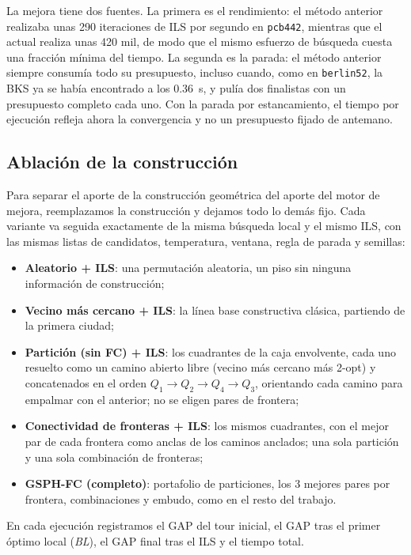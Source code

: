 \documentclass[runningheads]{llncs}
\begin{document}
La mejora tiene dos fuentes. La primera es el rendimiento: el método
anterior realizaba unas 290 iteraciones de ILS por segundo en
\texttt{pcb442}, mientras que el actual realiza unas 420 mil, de modo
que el mismo esfuerzo de búsqueda cuesta una fracción mínima del tiempo.
La segunda es la parada: el método anterior siempre consumía todo su
presupuesto, incluso cuando, como en \texttt{berlin52}, la BKS ya se
había encontrado a los 0.36~s, y pulía dos finalistas con un presupuesto
completo cada uno. Con la parada por estancamiento, el tiempo por
ejecución refleja ahora la convergencia y no un presupuesto fijado de
antemano.

\subsection{Ablación de la construcción}
\label{sec:ablation}

Para separar el aporte de la construcción geométrica del aporte del
motor de mejora, reemplazamos la construcción y dejamos todo lo demás
fijo. Cada variante va seguida exactamente de la misma búsqueda local y
el mismo ILS, con las mismas listas de candidatos, temperatura, ventana,
regla de parada y semillas:
\begin{itemize}
  \item \textbf{Aleatorio + ILS}: una permutación aleatoria, un piso sin
    ninguna información de construcción;
  \item \textbf{Vecino más cercano + ILS}: la línea base constructiva
    clásica, partiendo de la primera ciudad;
  \item \textbf{Partición (sin FC) + ILS}: los cuadrantes de la caja
    envolvente, cada uno resuelto como un camino abierto libre (vecino
    más cercano más 2-opt) y concatenados en el orden
    $Q_1\!\to\!Q_2\!\to\!Q_4\!\to\!Q_3$, orientando cada camino para
    empalmar con el anterior; no se eligen pares de frontera;
  \item \textbf{Conectividad de fronteras + ILS}: los mismos cuadrantes,
    con el mejor par de cada frontera como anclas de los caminos
    anclados; una sola partición y una sola combinación de fronteras;
  \item \textbf{GSPH-FC (completo)}: portafolio de particiones, los 3
    mejores pares por frontera, combinaciones y embudo, como en el resto
    del trabajo.
\end{itemize}
En cada ejecución registramos el GAP del tour inicial, el GAP tras el
primer óptimo local (\emph{BL}), el GAP final tras el ILS y el tiempo
total.
\end{document}
